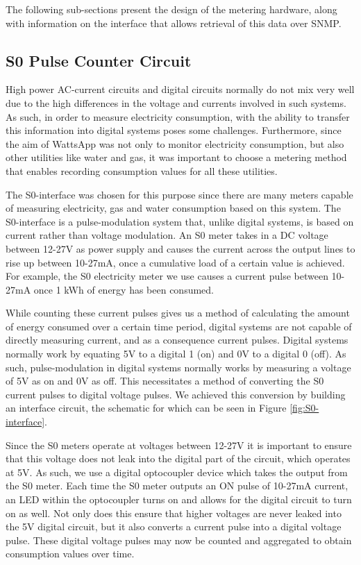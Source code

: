 \documentclass[10pt, conference, compsocconf]{IEEEtran}
\begin{document}
The following sub-sections present the design of the metering hardware,
along with information on the interface that allows retrieval of this
data over SNMP.


\subsection{S0 Pulse Counter Circuit}

High power AC-current circuits and digital circuits normally do not
mix very well due to the high differences in the voltage and currents
involved in such systems. As such, in order to measure electricity
consumption, with the ability to transfer this information into digital
systems poses some challenges. Furthermore, since the aim of WattsApp
was not only to monitor electricity consumption, but also other utilities
like water and gas, it was important to choose a metering method that
enables recording consumption values for all these utilities.

The S0-interface was chosen for this purpose since there are many
meters capable of measuring electricity, gas and water consumption
based on this system. The S0-interface is a pulse-modulation system
that, unlike digital systems, is based on current rather than voltage
modulation. An S0 meter takes in a DC voltage between 12-27V as power
supply and causes the current across the output lines to rise up between
10-27mA, once a cumulative load of a certain value is achieved. For
example, the S0 electricity meter we use causes a current pulse between
10-27mA once 1 kWh of energy has been consumed.

While counting these current pulses gives us a method of calculating
the amount of energy consumed over a certain time period, digital
systems are not capable of directly measuring current, and as a consequence
current pulses. Digital systems normally work by equating 5V to a
digital 1 (on) and 0V to a digital 0 (off). As such, pulse-modulation
in digital systems normally works by measuring a voltage of 5V as
on and 0V as off. This necessitates a method of converting the S0
current pulses to digital voltage pulses. We achieved this conversion
by building an interface circuit, the schematic for which can be seen
in Figure \ref{fig:S0-interface}.

Since the S0 meters operate at voltages between 12-27V it is important
to ensure that this voltage does not leak into the digital part of
the circuit, which operates at 5V. As such, we use a digital optocoupler
device which takes the output from the S0 meter. Each time the S0
meter outputs an ON pulse of 10-27mA current, an LED within the optocoupler
turns on and allows for the digital circuit to turn on as well. Not
only does this ensure that higher voltages are never leaked into the
5V digital circuit, but it also converts a current pulse into a digital
voltage pulse. These digital voltage pulses may now be counted and
aggregated to obtain consumption values over time.
\end{document}
